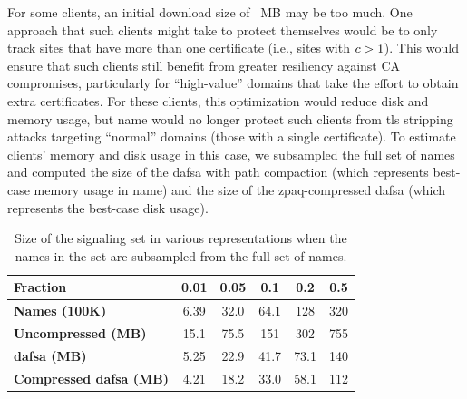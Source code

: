 
For some clients, an initial download size of \fsapczpaqmedsize{}~MB may be too
much. One approach that such clients might take to protect themselves would be
to only track sites that have more than one certificate (i.e., sites with
$c > 1$). This would ensure that such clients still benefit from greater
resiliency against CA compromises, particularly for ``high-value'' domains that
take the effort to obtain extra certificates. For these clients, this
optimization would reduce disk and memory usage, but \ac{name} would
no longer protect such clients from \ac{tls} stripping attacks targeting
``normal'' domains (those with a single certificate). To estimate clients'
memory and disk usage in this case, we subsampled the full set of names and
computed the size of the \ac{dafsa} with path compaction (which represents
best-case memory usage in \ac{name}) and the size of the zpaq-compressed
\ac{dafsa} (which represents the best-case disk usage).

\begin{table}[tbp]
  \centering
  \small
  \caption{Size of the signaling set in various representations when the names
  in the set are subsampled from the full set of names.}
  \begin{tabular}{|lccccc|}
    \toprule
    \textbf{Fraction} & \textbf{0.01} & \textbf{0.05} & \textbf{0.1} &
    \textbf{0.2} & \textbf{0.5} \\
    \midrule
    \textbf{Names (100K)} & 6.39 & 32.0 & 64.1 & 128 & 320 \\
    \midrule
    \textbf{Uncompressed (MB)} & 15.1 & 75.5 & 151 & 302 & 755 \\
    \textbf{\ac{dafsa} (MB)} & 5.25 & 22.9 & 41.7 & 73.1 & 140 \\
    \textbf{Compressed \ac{dafsa} (MB)} & 4.21 & 18.2 & 33.0 & 58.1 & 112 \\
    \bottomrule
  \end{tabular}
  \label{tab:sample}
\end{table}

